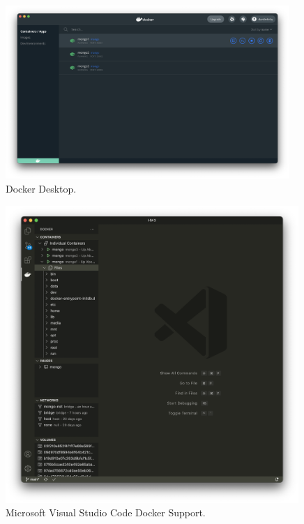 \documentclass{article}
\begin{document}
\begin{figure}[ht]
    \centering
    \includegraphics[width=0.96\textwidth]{Docker-Desktop.png}
    \vspace{-1em}\caption{Docker Desktop.}
    \label{fig:Docker-Desktop}
\end{figure}

\begin{figure}[ht]
    \centering
    \includegraphics[width=0.99\textwidth]{Docker-VSCode.png}
    \vspace{-2em}\caption{Microsoft Visual Studio Code Docker Support.}
    \label{fig:Docker-VSCode}
\end{figure}
\end{document}
